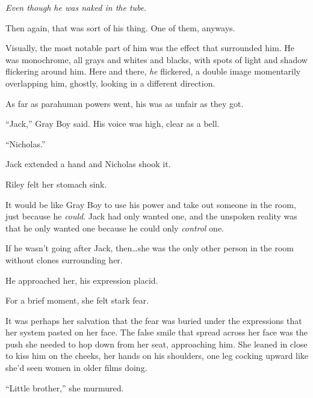 \emph{Even though he was naked in the tube}.



Then again, that was sort of his thing.  One of them, anyways.



Visually, the most notable part of him was the effect that surrounded him.  He was monochrome, all grays and whites and blacks, with spots of light and shadow flickering around him.  Here and there, \emph{he} flickered, a double image momentarily overlapping him, ghostly, looking in a different direction.



As far as parahuman powers went, his was as unfair as they got.



``Jack,'' Gray Boy said.  His voice was high, clear as a bell.



``Nicholas.''



Jack extended a hand and Nicholas shook it.



Riley felt her stomach sink.



It would be like Gray Boy to use his power and take out someone in the room, just because he \emph{could}.  Jack had only wanted one, and the unspoken reality was that he only wanted one because he could only \emph{control} one.



If he wasn't going after Jack, then\ldots she was the only other person in the room without clones surrounding her.



He approached her, his expression placid.



For a brief moment, she felt stark fear.



It was perhaps her salvation that the fear was buried under the expressions that her system pasted on her face.  The false smile that spread across her face was the push she needed to hop down from her seat, approaching him.  She leaned in close to kiss him on the cheeks, her hands on his shoulders, one leg cocking upward like she'd seen women in older films doing.



``Little brother,'' she murmured.




